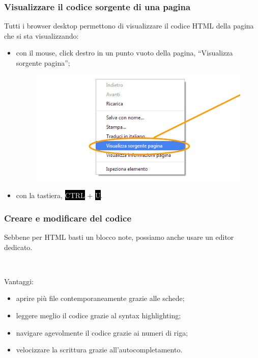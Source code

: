 \documentclass[]{beamer}
\begin{document}
\begin{frame}
\frametitle{Visualizzare il codice sorgente di una pagina}
Tutti i browser desktop permettono di visualizzare il codice HTML della pagina che si sta visualizzando:\pause
\begin{itemize}
  \item con il mouse, click destro in un punto vuoto della pagina, ``Visualizza sorgente pagina'';
\begin{figure}
\includegraphics[width=.6\columnwidth]{screenshots/sorgente.jpg}
\end{figure}\pause
  \item con la tastiera, \colorbox{black}{\textcolor{white}{CTRL}} + \colorbox{black}{\textcolor{white}{U}}.
\end{itemize}
\end{frame}


\begin{frame}
\frametitle{Creare e modificare del codice}
Sebbene per HTML basti un blocco note, possiamo anche usare un \alert<1>{editor dedicato}.\pause

~

Vantaggi:
\begin{itemize}
  \item aprire più file contemporaneamente grazie alle \alert<2->{schede};\pause
  \item leggere meglio il codice grazie al \alert<3->{syntax highlighting};\pause
  \item navigare agevolmente il codice grazie ai \alert<4->{numeri di riga};\pause
  \item velocizzare la scrittura grazie all'\alert<5->{autocompletamento}.
\end{itemize}
\end{frame}
\end{document}
